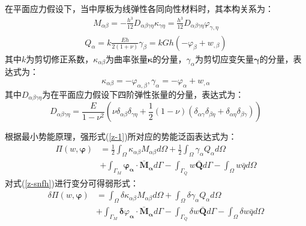 在平面应力假设下，当中厚板为线弹性各同向性材料时，其本构关系为：
\begin{equation} 
    \begin{split}
    M_{\alpha \beta}=-\frac{h^3}{12}D_{\alpha \beta \gamma\eta}\kappa_{\gamma\eta}=\frac{h^3}{12}D_{\alpha \beta \gamma\eta}\varphi_{\gamma,\eta}
    \end{split}
\end{equation}
\begin{equation} 
    \begin{split}
    Q_{\alpha}=k\frac{Eh}{2(1+\nu)}\gamma_\beta=kGh(-\varphi_\beta+w_{,\beta})
    \end{split}
\end{equation}
其中$k$为剪切修正系数，$\kappa_{\alpha\beta}$为曲率张量$\pmb\kappa$的分量，$\gamma_\alpha$为剪切应变矢量$\pmb\gamma$的分量，表达式为：
\begin{equation} 
    \kappa_{\alpha\beta}=-\varphi_{\alpha,\beta},\gamma_\alpha=-\varphi_\alpha+w_{,\alpha}
\end{equation}
其中$D_{\alpha \beta \gamma\eta}$为在平面应力假设下四阶弹性张量的分量，表达式为：
\begin{equation} 
    D_{\alpha \beta \gamma\eta}=\frac{E}{1-\nu^2}(\nu\delta_{\alpha\beta}\delta_{\gamma\eta}+\frac{1}{2}(1-\nu)(\delta_{\alpha\gamma}\delta_{\beta\eta}+\delta_{\alpha\eta}\delta_{\beta\gamma}))
\end{equation}

根据最小势能原理，强形式(\ref{z-1})所对应的势能泛函表达式为： 
\begin{equation}\label{z-snfh}
\begin{split} 
    \Pi(w,\boldsymbol{\varphi})&=\frac{1}{2}\int_{\Omega}\kappa_{\alpha\beta}M_{\alpha\beta}d\Omega+\frac{1}{2}\int_{\Omega}\gamma_{\alpha}Q_{\alpha}d\Omega\\
    &+\int_{\Gamma_{M}}\pmb\varphi_{\pmb \alpha}\cdot{\bar{\pmb M}_{\pmb{\alpha}}}d\Gamma-\int_{\Gamma_{Q}}{w}\bar {\pmb Q}d\Gamma-\int_{\Omega} w\bar{q}d\Omega
\end{split}
\end{equation}
对式(\ref{z-snfh})进行变分可得弱形式：
\begin{equation}\label{z-rxs}
    \begin{split} 
        \delta\Pi(w,\boldsymbol{\varphi})&=\int_{\Omega}\delta\kappa_{\alpha\beta}M_{\alpha\beta}d\Omega+\int_{\Omega}\delta\gamma_{\alpha}Q_{\alpha}d\Omega\\
        &+\int_{\Gamma_{M}}\pmb\delta\varphi_{\pmb \alpha}\cdot{\bar{\pmb M}_{\pmb{\alpha}}}d\Gamma-\int_{\Gamma_{Q}}{\delta{w}}\bar {\pmb Q}d\Gamma-\int_{\Omega} \delta{w}\bar{q}d\Omega
    \end{split}
    \end{equation}

